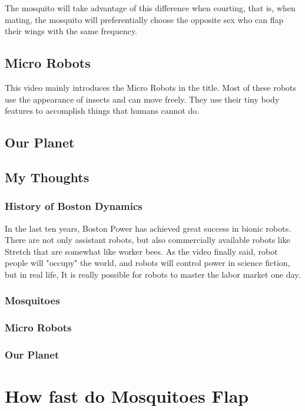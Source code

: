 \documentclass{article}
\begin{document}
The mosquito will take advantage of this difference when courting, that is, when mating, the mosquito will preferentially choose the opposite sex who can flap their wings with the same frequency.
\subsection{Micro Robots}
This video mainly introduces the Micro Robots in the title. Most of these robots use the appearance of insects and can move freely. They use their tiny body features to accomplish things that humans cannot do.

\subsection{Our Planet}


\subsection{My Thoughts}
\subsubsection*{History of Boston Dynamics}
In the last ten years, Boston Power has achieved great success in bionic robots. There are not only assistant robots, but also commercially available robots like Stretch that are somewhat like worker bees. As the video finally said, robot people will "occupy" the world, and robots will control power in science fiction, but in real life, It is really possible for robots to master the labor market one day.

\subsubsection*{Mosquitoes}

\subsubsection*{Micro Robots}

\subsubsection*{Our Planet}


\section{How fast do Mosquitoes Flap}
\end{document}
